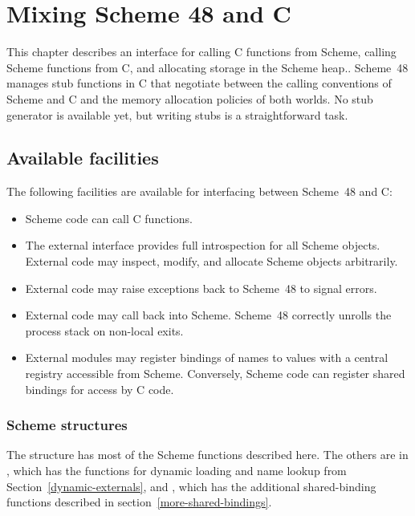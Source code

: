 \chapter{Mixing Scheme 48 and C}
\label{external-chapter}

This chapter describes an interface for calling C functions
 from Scheme, calling Scheme functions from C, and allocating
 storage in the Scheme heap..
Scheme~48 manages stub functions in C that
 negotiate between the calling conventions of Scheme and C and the
 memory allocation policies of both worlds.
No stub generator is available yet, but writing stubs is a straightforward task.

\section{Available facilities}
\label{sec:facilities}

The following facilities are available for interfacing between
 Scheme~48 and C:
%
\begin{itemize}
\item Scheme code can call C functions.
\item The external interface provides full introspection for all
  Scheme objects.  External code may inspect, modify, and allocate
  Scheme objects arbitrarily.
\item External code may raise exceptions back to Scheme~48 to
  signal errors.
\item External code may call back into Scheme.  Scheme~48
  correctly unrolls the process stack on non-local exits.
\item External modules may register bindings of names to values with a 
  central registry accessible from
  Scheme.  Conversely, Scheme code can register shared
  bindings for access by C code.
\end{itemize}
%

\subsection{Scheme structures}

The structure  has 
 most of the Scheme functions described here.
The others are in 
 , which has the functions for dynamic loading and
 name lookup from
Section~\ref{dynamic-externals},
 and , which has the additional shared-binding functions
 described in
section~\ref{more-shared-bindings}.

